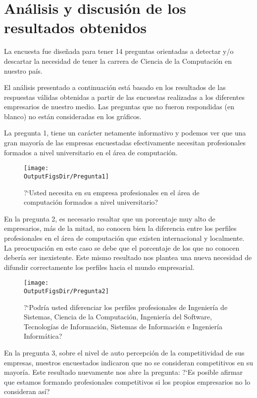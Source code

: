 \section{Análisis y discusión de los resultados obtenidos}\label{sec:cs-resultados-de-la-encuesta}

La encuesta fue diseñada para tener 14 preguntas orientadas a detectar y/o descartar la necesidad de tener la carrera de Ciencia de la Computación en nuestro país.

El análisis presentado a continuación está basado en los resultados de las respuestas válidas obtenidas a partir de las encuestas realizadas a los diferentes empresarios de nuestro medio. Las preguntas que no fueron respondidas (en blanco) no están consideradas en los gráficos.

La pregunta 1, tiene un carácter netamente informativo y podemos ver que una gran mayoría de las empresas encuestadas efectivamente necesitan profesionales formados a nivel universitario en el área de computación.

\newcommand{\mywidth}{10cm}

\begin{figure}[!h]
	\centering
	\texttt{[image: \\OutputFigsDir/Pregunta1]}
	\label{fig:Preg1}
	\caption{?`Usted necesita en su empresa profesionales en el área de computación formados a nivel universitario?}
\end{figure}


En la pregunta 2, es necesario resaltar que un porcentaje muy alto de empresarios, más de la mitad, no conocen bien la diferencia entre los perfiles profesionales en el área de computación que existen internacional y localmente. La preocupación en este caso se debe que el porcentaje de los que no conocen debería ser inexistente. Este mismo resultado nos plantea una nueva necesidad de difundir correctamente los perfiles hacia el mundo empresarial.


\begin{figure}[!h]
	\centering
	\texttt{[image: \\OutputFigsDir/Pregunta2]}
	\label{fig:Preg2}
	\caption{?`Podría usted diferenciar los perfiles profesionales de Ingeniería de Sistemas, Ciencia de la Computación, Ingeniería del Software, Tecnologías de Información, Sistemas de Información e Ingeniería Informática?}
\end{figure}

En la pregunta 3, sobre el nivel de auto percepción de la competitividad de sus empresas, nuestros encuestados indicaron que no se consideran competitivos en su mayoría. Este resultado nuevamente nos abre la pregunta: ?`Es posible afirmar que estamos formando profesionales competitivos si los propios empresarios no lo consideran así?

